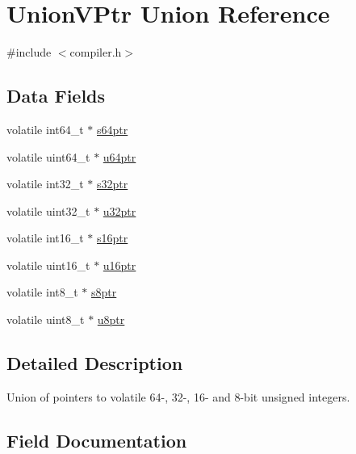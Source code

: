 \hypertarget{union_union_v_ptr}{}\section{Union\+V\+Ptr Union Reference}
\label{union_union_v_ptr}


{\ttfamily \#include $<$compiler.\+h$>$}

\subsection*{Data Fields}
\begin{DoxyCompactItemize}
\item 
volatile int64\+\_\+t $\ast$ \mbox{\hyperlink{union_union_v_ptr_a2908c8cb1c7d816d7f9d3a30531818f8}{s64ptr}}
\item 
volatile uint64\+\_\+t $\ast$ \mbox{\hyperlink{union_union_v_ptr_a1acc0e7be6320444fc9a35fbd89f1f37}{u64ptr}}
\item 
volatile int32\+\_\+t $\ast$ \mbox{\hyperlink{union_union_v_ptr_ac419cbdd704de7024e989caaf9e19a98}{s32ptr}}
\item 
volatile uint32\+\_\+t $\ast$ \mbox{\hyperlink{union_union_v_ptr_abdec22b9984813fac831e57d45cae742}{u32ptr}}
\item 
volatile int16\+\_\+t $\ast$ \mbox{\hyperlink{union_union_v_ptr_aee6c3ba77b4b25f556abb8a41053caf4}{s16ptr}}
\item 
volatile uint16\+\_\+t $\ast$ \mbox{\hyperlink{union_union_v_ptr_ae008948f89e2a5ee3102016f82023b42}{u16ptr}}
\item 
volatile int8\+\_\+t $\ast$ \mbox{\hyperlink{union_union_v_ptr_ab07ceff1caf6f3bb01bd31296a36daf9}{s8ptr}}
\item 
volatile uint8\+\_\+t $\ast$ \mbox{\hyperlink{union_union_v_ptr_a4213589251839cd1f42c3343c6cb9be9}{u8ptr}}
\end{DoxyCompactItemize}


\subsection{Detailed Description}
Union of pointers to volatile 64-\/, 32-\/, 16-\/ and 8-\/bit unsigned integers. 

\subsection{Field Documentation}
\mbox{\label{union_union_v_ptr_aee6c3ba77b4b25f556abb8a41053caf4}} 
